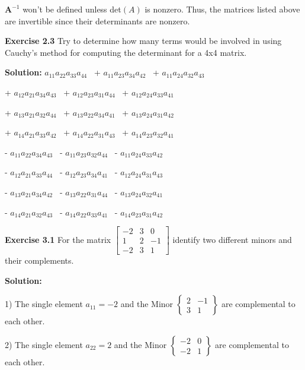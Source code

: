 \documentclass[12pt]{article}
\newcommand{\sol} {\textbf{Solution:}}
\newcommand{\A} {\mathbf{A}}
\begin{document}
\(\A^{-1}\) won't be defined unless det\((A)\) is nonzero. Thus, the matrices listed above are invertible since their determinants are nonzero.

\bigskip

\noindent\textbf{Exercise 2.3 }Try to determine how many terms would be
involved in using Cauchy's method for computing the determinant for a 4x4 matrix.

\sol
$a_{11} a_{22} a_{33} a_{44}$~ + $a_{11} a_{23} a_{34} a_{42}$~ + $a_{11} a_{24} a_{32} a_{43}$~ 

+ $a_{12} a_{21} a_{34} a_{43}$~ +
$a_{12} a_{23} a_{31} a_{44}$~ +
$a_{12} a_{24} a_{33} a_{41}$~ 

+ $a_{13} a_{21} a_{32} a_{44}$~ +
$a_{13} a_{22} a_{34} a_{41}$~ +
$a_{13} a_{24} a_{31} a_{42}$~ 

+ $a_{14} a_{21} a_{33} a_{42}$~ +
$a_{14} a_{22} a_{31} a_{43}$~ +
$a_{14} a_{23} a_{32} a_{41}$~

- $a_{11} a_{22} a_{34} a_{43}$~ - $a_{11} a_{23} a_{32} a_{44}$~ - $a_{11} a_{24} a_{33} a_{42}$~

- $a_{12} a_{21} a_{33} a_{44}$~ - $a_{12} a_{23} a_{34} a_{41}$~ - $a_{12} a_{24} a_{31} a_{43}$~

- $a_{13} a_{21} a_{34} a_{42}$~ - $a_{13} a_{22} a_{31} a_{44}$~ - $a_{13} a_{24} a_{32} a_{41}$~

- $a_{14} a_{21} a_{32} a_{43}$~ - $a_{14} a_{22} a_{33} a_{41}$~ - $a_{14} a_{23} a_{31} a_{42}$~ 

\bigskip

\noindent\textbf{Exercise 3.1} For the matrix $%
\begin{bmatrix}
-2 & 3 & 0\\
1 & 2 & -1\\
-2 & 3 & 1
\end{bmatrix}
$ identify two different minors and their complements.

\bigskip

\sol

1) The single element \(a_{11} = -2\) and the Minor
\(
\begin{Bmatrix}
2 & -1 \\
3 & 1
\end{Bmatrix}
\)
are complemental to each other.

2) The single element \(a_{22} = 2\) and the Minor
\(
\begin{Bmatrix}
-2 & 0 \\
-2 & 1
\end{Bmatrix}
\)
are complemental to each other.
\end{document}
